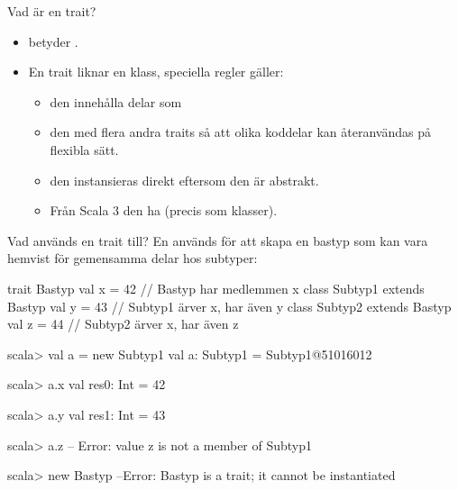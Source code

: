 \begin{Slide}{Vad är en trait?}
\begin{itemize}
\item {} betyder .

\item En trait liknar en klass,  speciella regler gäller:

\begin{itemize}

\item den  innehålla delar som 

\item den  med flera andra traits så att olika koddelar kan återanvändas på flexibla sätt.

\item den  instansieras direkt eftersom den är abstrakt.

\item Från Scala 3  den ha  (precis som klasser).
\end{itemize}
\end{itemize}

\end{Slide}

\begin{Slide}{Vad används en trait till?}
En  används för att skapa en bastyp som kan vara hemvist för gemensamma delar hos subtyper:
\begin{Code}
trait Bastyp { val x = 42 }                 // Bastyp har medlemmen x
class Subtyp1 extends Bastyp { val y = 43 } // Subtyp1 ärver x, har även y
class Subtyp2 extends Bastyp { val z = 44 } // Subtyp2 ärver x, har även z
\end{Code}
\pause\vspace{-0.5em}
\begin{REPLsmall}
scala> val a = new Subtyp1
val a: Subtyp1 = Subtyp1@51016012

scala> a.x
val res0: Int = 42

scala> a.y
val res1: Int = 43

scala> a.z
-- Error:
  value z is not a member of Subtyp1

scala> new Bastyp
--Error:
  Bastyp is a trait; it cannot be instantiated
\end{REPLsmall}

\end{Slide}


